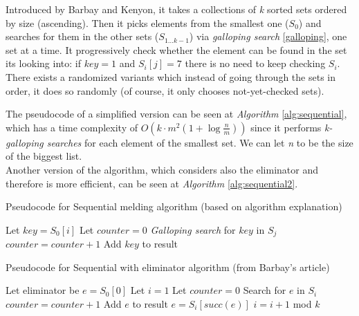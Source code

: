 Introduced by Barbay and Kenyon, it takes a collections of \textit{k} sorted sets ordered by size (ascending). Then it picks elements from the smallest one ($S_0$) and searches for them in the other sets ($S_{1 \ldots k-1}$) via \textit{galloping search} \ref{galloping}, one set at a time. It progressively check whether the element can be found in the set its looking into: if $key=1$ and $S_i[j]=7$ there is no need to keep checking $S_i$.
There exists a randomized variants which instead of going through the sets in order, it does so randomly (of course, it only chooses not-yet-checked sets).

The pseudocode of a simplified version can be seen at \textit{Algorithm} \ref{alg:sequential}, which has a time complexity of $O\left(k \cdot m^2 \left(1+ \log \frac{n}{m}\right)\right)$ since it performs \textit{k-galloping searches} for each element of the smallest set. We can let \textit{n} to be the size of the biggest list.\\
Another version of the algorithm, which considers also the eliminator and therefore is more efficient, can be seen at \textit{Algorithm} \ref{alg:sequential2}.

\begin{algorithm}
    \captionsetup{labelsep=newline}
    \caption{Pseudocode for Sequential melding algorithm \label{alg:sequential} (based on algorithm explanation)}
    \begin{algorithmic}[1]
            \State Let $key=S_0[i]$
            \State Let $counter=0$
                \State \textit{Galloping search} for $key$ in $S_j$
                    \State $counter = counter+1$
                \EndIf
            \EndFor
                \State Add $key$ to result
            \EndIf
        \EndFor
    \end{algorithmic}
\end{algorithm}

\begin{algorithm}
    \captionsetup{labelsep=newline}
    \caption{Pseudocode for Sequential with eliminator algorithm \label{alg:sequential2} (from Barbay's article)}
    \begin{algorithmic}[1]
        \State Let eliminator be $e=S_0[0]$ 
        \State Let $i=1$
        \State Let $counter=0$
            \State Search for $e$ in $S_i$
                \State $counter=counter+1$
                    \State Add $e$ to result
                \EndIf
            \Else
                \State $e=S_i\left[succ(e)\right]$
            \EndIf
            \State $i=i+1$ mod $k$
        \EndWhile
    \end{algorithmic}
\end{algorithm}

